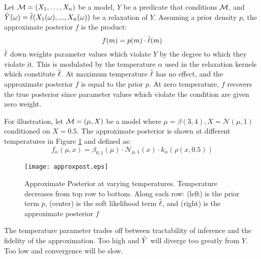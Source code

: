 Let ${\mathcal{M}} = (X_1, \dots, X_n)$ be a model, $Y$ be a predicate that conditions ${\mathcal{M}}$, and  $\tilde{Y}(\omega) = \tilde{\operatorname{\ell}}(X_1(\omega), ..., X_n(\omega))$ be a relaxation of $Y$.
Assuming a prior density $p$, the approximate posterior $f$ is the product:
\begin{equation}
f(m) = p(m) \cdot \tilde{\operatorname{\ell}}(m)
\end{equation}
$\tilde{\operatorname{\ell}}$ down weights parameter values which violate $Y$ by the degree to which they violate it. 
This is modulated by the temperature $\alpha$ used in the  relaxation kernels which constitute $\tilde{\operatorname{\ell}}$.
At maximum temperature $\tilde{\operatorname{\ell}}$ has no effect, and the approximate posterior $f$ is equal to the prior $p$.
At zero temperature, $f$ recovers the true posterior since parameter values which violate the condition are given zero weight.

For illustration, let ${\mathcal{M}} = (\mu, X)$ be a model where $\mu = \beta(3, 4), X = \mathcal{N}(\mu, 1)$  conditioned on $X = 0.5$.
The approximate posterior is shown at different temperatures in Figure \ref{temppost} and defined as:
\begin{equation}\label{approxposterior}
f_\alpha(\mu, x) = \beta_{0,1}(\mu) \cdot \mathcal{N}_{\mu,1}(x) \cdot k_\alpha(\rho(x, 0.5)) 
\end{equation}

\begin{figure}
\texttt{[image: approxpost.eps]}
\caption{Approximate Posterior at varying temperatures.  Temperature decreases from top row to bottom.  Along each row: (left) is the prior term $p$, (center) is the soft likelihood term $\tilde{\operatorname{\ell}}$, and (right) is the approximate posterior $f$}
\label{temppost}
\end{figure}

The temperature parameter trades off between tractability of inference and the fidelity of the approximation.
Too high and $\tilde{Y}$ will diverge too greatly from $Y$. Too low and convergence will be slow.

